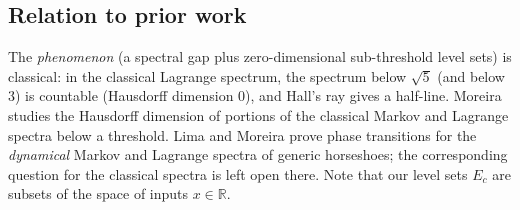 \documentclass[11pt]{article}
\theoremstyle{definition}
\theoremstyle{remark}
\newcommand{\R}{\mathbb{R}}
\begin{document}
\subsection{Relation to prior work}\label{sec:prior}

The \emph{phenomenon} (a spectral gap plus zero-dimensional sub-threshold level
sets) is classical: in the classical Lagrange spectrum, the spectrum below
$\sqrt5$ (and below $3$) is countable (Hausdorff dimension $0$), and Hall's ray
gives a half-line. Moreira \cite{Moreira} studies the Hausdorff dimension of
portions of the classical Markov and Lagrange spectra below a threshold. Lima
and Moreira \cite{LimaMoreira} prove phase transitions for the \emph{dynamical}
Markov and Lagrange spectra of generic horseshoes; the corresponding question
for the classical spectra is left open there. Note that our level sets $E_c$ are
subsets of the space of inputs $x\in\R$.
\end{document}
